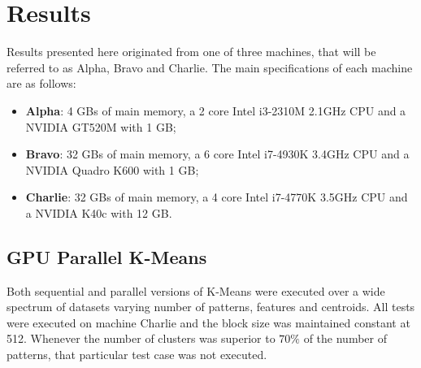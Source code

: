
\section{Results}
\label{sec:resul}

Results presented here originated from one of three machines, that will be referred to as Alpha, Bravo and Charlie.
The main specifications of each machine are as follows:
\begin{itemize}
  \item \textbf{Alpha}: 4 GBs of main memory, a 2 core Intel i3-2310M 2.1GHz CPU and a NVIDIA GT520M with 1 GB;
  \item \textbf{Bravo}: 32 GBs of main memory, a 6 core Intel i7-4930K 3.4GHz CPU and a NVIDIA Quadro K600 with 1 GB;
  \item \textbf{Charlie}: 32 GBs of main memory, a 4 core Intel i7-4770K 3.5GHz CPU and a NVIDIA K40c with 12 GB.
\end{itemize}

\subsection{GPU Parallel K-Means}

Both sequential and parallel versions of K-Means were executed over a wide spectrum of datasets varying number of patterns, features and centroids.
All tests were executed on machine Charlie and the block size was maintained constant at 512.
Whenever the number of clusters was superior to $70\%$ of the number of patterns, that particular test case was not executed.


